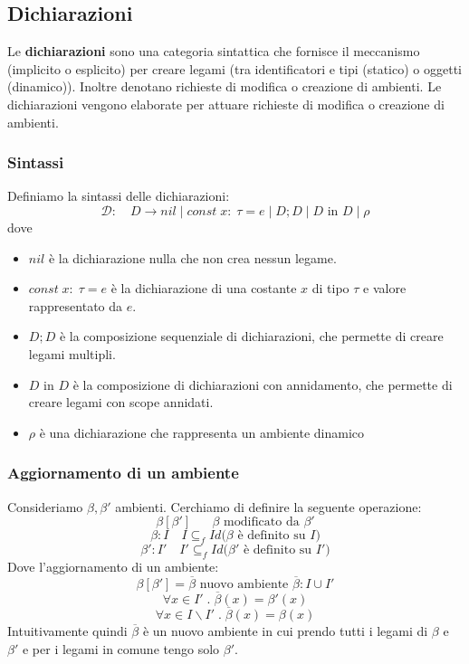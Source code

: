 \documentclass[a4paper]{article}
\begin{document}
\subsection{Dichiarazioni}

Le \textbf{dichiarazioni} sono una categoria sintattica che fornisce 
il meccanismo (implicito o esplicito) per creare legami (tra identificatori 
e tipi (statico) o oggetti (dinamico)).
Inoltre denotano richieste di modifica o creazione di ambienti.
Le dichiarazioni vengono elaborate per attuare richieste di modifica o
creazione di ambienti.

\subsubsection{Sintassi}

Definiamo la sintassi delle dichiarazioni:
\[
  \mathcal{D}: \quad D \to nil \; | \; const\; x : \; \tau = e \; | \;  D ; D \; | \;  D \text{ in } D \; | \; \rho 
\]
dove 
\begin{itemize}
  \item $nil$ è la dichiarazione nulla che non crea nessun legame.
  \item $const\; x : \; \tau = e$ è la dichiarazione di una costante $x$ di tipo $\tau$ e valore rappresentato da $e$.
  \item $D ; D$ è la composizione sequenziale di dichiarazioni, che permette di creare legami multipli.
  \item $D \text{ in } D$ è la composizione di dichiarazioni con annidamento, che permette di creare legami con scope annidati.
  \item $\rho$ è una dichiarazione che rappresenta un ambiente dinamico
\end{itemize}

\subsubsection{Aggiornamento di un ambiente}

Consideriamo $\beta, \beta'$ ambienti. Cerchiamo di definire la 
seguente operazione: 
\[
  \beta[\beta'] \quad \text{ $\beta$ modificato da $\beta'$}
\]
\[
  \beta: I \quad I \subseteq_f Id \text{($\beta$ è definito su $I$)}
\]
\[
  \beta': I' \quad I' \subseteq_f Id \text{($\beta'$ è definito su $I'$)}
\]
Dove l'aggiornamento di un ambiente:
\[
  \beta[\beta'] = \overline{\beta} \text{ nuovo ambiente } \overline{\beta} : I \cup I' 
\]
\[
  \forall x \in I' \; . \; \overline{\beta}(x) = \beta'(x)
\]
\[
  \forall x \in I \backslash I' \; . \; \overline{\beta}(x) = \beta(x)
\]
Intuitivamente quindi $\overline{\beta}$ è un nuovo ambiente in cui 
prendo tutti i legami di $\beta$ e $\beta'$ e per i legami in comune 
tengo solo $\beta'$.
\end{document}

